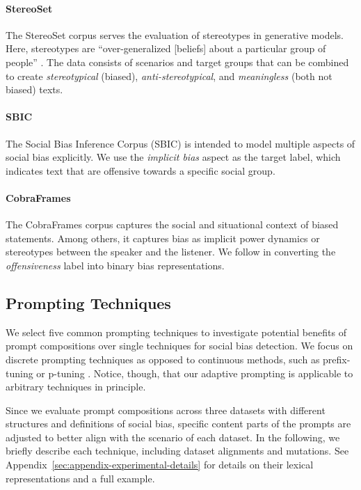\paragraph{StereoSet}
The StereoSet corpus \cite{nadeem2021} serves the evaluation of stereotypes in generative models. Here, stereotypes are ``over-generalized [beliefs] about a particular group of people'' \cite{nadeem2021}. The data consists of scenarios and target groups that can be combined to create \textit{stereotypical} (biased), \textit{anti-stereotypical}, and \textit{meaningless} (both not biased) texts.


\paragraph{SBIC}
The Social Bias Inference Corpus (SBIC) \citet{sap2020} is intended to model multiple aspects of social bias explicitly. We use the \emph{implicit bias} aspect as the target label, which indicates text that are offensive towards a specific social group.


\paragraph{CobraFrames}
The CobraFrames corpus \cite{zhou2023a} captures the social and situational context of biased statements. Among others, it captures bias as implicit power dynamics or stereotypes between the speaker and the listener. We follow \citet{zhou2023a} in converting the \textit{offensiveness} label into binary bias representations.



\subsection{Prompting Techniques}
\label{sec:experiments:prompts}
We select five common prompting techniques to investigate potential benefits of prompt compositions over single techniques for social bias detection. We focus on discrete prompting techniques as opposed to continuous methods, such as prefix-tuning \cite{li2021b} or p-tuning \cite{liu2022a}. Notice, though, that our adaptive prompting is applicable to arbitrary techniques in principle.

Since we evaluate prompt compositions across three datasets with different structures and definitions of social bias, specific content parts of the prompts are adjusted to better align with the scenario of each dataset. In the following, we briefly describe each technique, including dataset alignments and mutations. See Appendix~\ref{sec:appendix-experimental-details} for details on their lexical representations and a full example.


